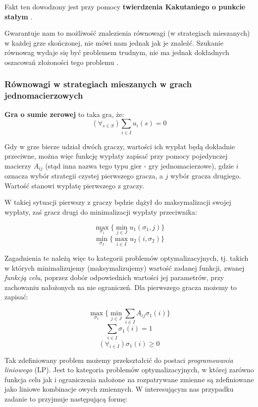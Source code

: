 \documentclass[polish]{standalone}
\begin{document}
Fakt ten dowodzony jest przy pomocy \textbf{twierdzenia Kakutaniego o punkcie stałym} \cite[str.~29]{FT-GT}.

Gwarantuje nam to możliwość znalezienia równowagi (w strategiach mieszanych) w każdej grze skończonej, nie mówi nam
jednak jak je znaleźć. Szukanie równowag wydaje się być problemem trudnym, nie ma jednak dokładnych oszacowań złożoności
tego problemu \cite{P-AGI}.

\subsubsection{Równowagi w strategiach mieszanych w grach jednomacierzowych}

\begin{definition}
\textbf{Gra o sumie zerowej} to taka gra, że:
$$(\forall_{s \in S}) \sum_{i \in I} u_i(s) = 0$$
\cite[str.~4]{FT-GT}
\end{definition}

Gdy w grze bierze udział dwóch graczy, wartości ich wypłat będą dokładnie przeciwne, można więc funkcję wypłaty zapisać
przy pomocy pojedynczej macierzy $A_{ij}$ (stąd inna nazwa tego typu gier - gry jednomacierzowe),
gdzie $i$ oznacza wybór strategii czystej pierwszego gracza, a $j$ wybór gracza drugiego. Wartość stanowi wypłatę
pierwszego z graczy.

W takiej sytuacji pierwszy z graczy będzie dążył do maksymalizacji swojej wypłaty, zaś gracz drugi do minimalizacji
wypłaty przeciwnika:

$$\max_{\sigma_1} \{ \min_{j \in J} u_1(\sigma_1, j) \}$$
$$\min_{\sigma_2} \{ \max_{i \in I} u_2(i, \sigma_2) \}$$

Zagadnienia te należą więc to kategorii problemów optymalizacyjnych, tj. takich w których minimalizujemy
(maksymalizujemy) wartość zadanej funkcji, zwanej \textit{funkcją celu}, poprzez dobór odpowiednich wartości jej
parametrów, przy zachowaniu nałożonych na nie ograniczeń. \cite[str.~41]{O-GT} Dla pierwszego gracza możemy to zapisać:

$$\max_{\sigma_1} \{ \min_{j \in J} \sum_{i \in I} A_{ij} \sigma_1(i) \}$$
$$\sum_{i \in I} \sigma_1(i) = 1$$
$$(\forall_{i \in I}) \sigma_1(i) \geq 0$$

Tak zdefiniowany problem możemy przekształcić do postaci \textit{programowania liniowego}
(LP). \cite[str.~62]{O-GT} Jest to kategoria problemów optymalizacyjnych, w której zarówno funkcja celu jak
i ograniczenia nałożone na rozpatrywane zmienne są zdefiniowane jako liniowe kombinacje owych zmiennych. W
interesującym nas przypadku zadanie to przyjmuje następującą formę:
\end{document}
